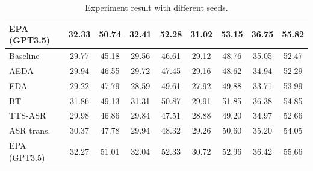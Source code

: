 \begin{table}[t]
{\begin{tabular}{l|cc|cc|cc|cc}
EPA (GPT3.5)          & 32.33 & 50.74 & 32.41 & 52.28 & 31.02 & 53.15 & 36.75 & 55.82 \\ \hline\hline
Baseline              & 29.77 & 45.18 & 29.56 & 46.61 & 29.12 & 48.76 & 35.05 & 52.47 \\ \hline
AEDA                  & 29.94 & 46.55 & 29.72 & 47.45 & 29.16 & 48.62 & 34.94 & 52.29 \\
EDA                   & 29.22 & 47.79 & 28.59 & 49.61 & 27.92 & 49.88 & 33.71 & 53.99 \\
BT                    & 31.86 & 49.13 & 31.31 & 50.87 & 29.91 & 51.85 & 36.38 & 54.85 \\
TTS-ASR               & 29.98 & 46.86 & 29.84 & 47.51 & 28.88 & 49.20 & 34.97 & 52.66 \\
ASR trans.                        & 30.37 & 47.78 & 29.94 & 48.32 & 29.26 & 50.60 & 35.20 & 54.05 \\
EPA (GPT3.5)          & 32.27 & 51.01 & 32.04 & 52.33 & 30.72 & 52.96 & 36.42 & 55.66 \\ \hline
\end{tabular}%
}
\caption{Experiment result with different seeds.}
\label{tab:seeds}
\end{table}
